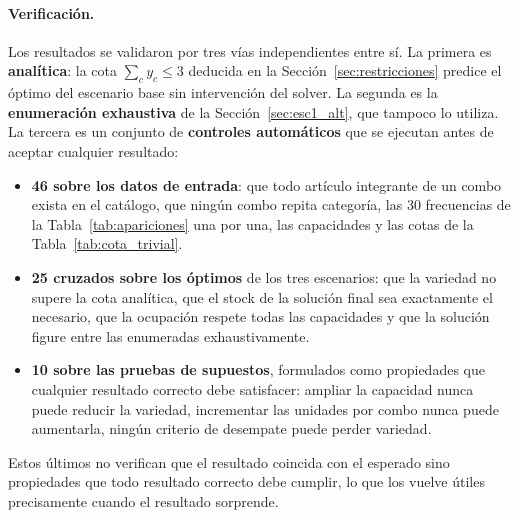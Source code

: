 \documentclass[10pt,a4paper]{article}
\begin{document}
\paragraph{Verificación.} Los resultados se validaron por tres vías
independientes entre sí. La primera es \textbf{analítica}: la cota
$\sum_c y_c \leq 3$ deducida en la Sección~\ref{sec:restricciones} predice el
óptimo del escenario base sin intervención del solver. La segunda es la
\textbf{enumeración exhaustiva} de la Sección~\ref{sec:esc1_alt}, que tampoco lo
utiliza. La tercera es un conjunto de \textbf{controles automáticos} que se
ejecutan antes de aceptar cualquier resultado:

\begin{itemize}
  \item \textbf{46 sobre los datos de entrada}: que todo artículo integrante de
  un combo exista en el catálogo, que ningún combo repita categoría, las 30
  frecuencias de la Tabla~\ref{tab:apariciones} una por una, las capacidades y
  las cotas de la Tabla~\ref{tab:cota_trivial}.
  \item \textbf{25 cruzados sobre los óptimos} de los tres escenarios: que la
  variedad no supere la cota analítica, que el stock de la solución final sea
  exactamente el necesario, que la ocupación respete todas las capacidades y que
  la solución figure entre las enumeradas exhaustivamente.
  \item \textbf{10 sobre las pruebas de supuestos}, formulados como propiedades
  que cualquier resultado correcto debe satisfacer: ampliar la capacidad nunca
  puede reducir la variedad, incrementar las unidades por combo nunca puede
  aumentarla, ningún criterio de desempate puede perder variedad.
\end{itemize}

Estos últimos no verifican que el resultado coincida con el esperado sino
propiedades que todo resultado correcto debe cumplir, lo que los vuelve útiles
precisamente cuando el resultado sorprende.

\renewcommand{\refname}{Bibliografía}
\end{document}
